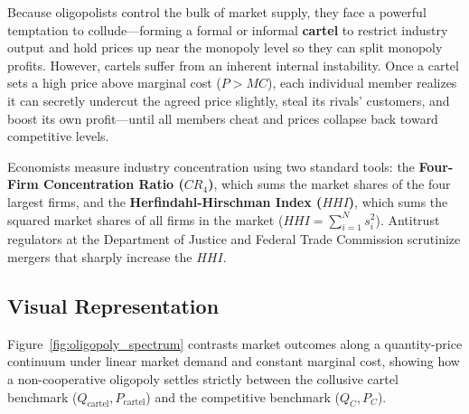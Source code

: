 \documentclass[11pt,letterpaper]{article}
\begin{document}
Because oligopolists control the bulk of market supply, they face a powerful temptation to collude—forming a formal or informal \textbf{cartel} to restrict industry output and hold prices up near the monopoly level so they can split monopoly profits. However, cartels suffer from an inherent internal instability. Once a cartel sets a high price above marginal cost ($P > MC$), each individual member realizes it can secretly undercut the agreed price slightly, steal its rivals' customers, and boost its own profit—until all members cheat and prices collapse back toward competitive levels.

Economists measure industry concentration using two standard tools: the \textbf{Four-Firm Concentration Ratio ($CR_4$)}, which sums the market shares of the four largest firms, and the \textbf{Herfindahl-Hirschman Index ($HHI$)}, which sums the squared market shares of all firms in the market ($HHI = \sum_{i=1}^N s_i^2$). Antitrust regulators at the Department of Justice and Federal Trade Commission scrutinize mergers that sharply increase the $HHI$.

\subsection*{Visual Representation}
Figure~\ref{fig:oligopoly_spectrum} contrasts market outcomes along a quantity-price continuum under linear market demand and constant marginal cost, showing how a non-cooperative oligopoly settles strictly between the collusive cartel benchmark ($Q_{\text{cartel}}, P_{\text{cartel}}$) and the competitive benchmark ($Q_C, P_C$).
\end{document}
